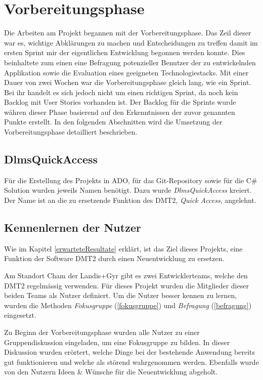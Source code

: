\section{Vorbereitungsphase}
Die Arbeiten am Projekt begannen mit der Vorbereitungsphase. Das Zeil dieser war es, wichtige Abklärungen zu machen und Entscheidungen zu treffen damit im ersten Sprint mir der eigentlichen Entwicklung begonnen werden konnte.
Dies beinhaltete zum einen eine Befragung potenzieller Benutzer der zu entwickelnden Applikation sowie die Evaluation eines geeigneten Technologiestacks.
Mit einer Dauer von zwei Wochen war die Vorbereitungsphase gleich lang, wie ein Sprint.
Bei ihr handelt es sich jedoch nicht um einen richtigen Sprint, da noch kein Backlog mit User Stories vorhanden ist.
Der Backlog für die Sprints wurde währen dieser Phase basierend auf den Erkenntnissen der zuvor genannten Punkte erstellt.
In den folgenden Abschnitten wird die Umsetzung der Vorbereitungsphase detailliert beschrieben.

\subsection{DlmsQuickAccess}
Für die Erstellung des Projekts in \ac{ADO}, für das Git-Repository sowie für die C\# Solution wurden jeweils Namen benötigt.
Dazu wurde \textit{DlmsQuickAccess} kreiert.
Der Name ist an die zu ersetzende Funktion des \ac{DMT2}, \textit{Quick Access}, angelehnt.

\subsection{Kennenlernen der Nutzer}\label{survey}
Wie im Kapitel \ref{erwarteteResultate} erklärt, ist das Ziel dieses Projekts, eine Funktion der Software \ac{DMT2} durch einen Neuentwicklung zu ersetzen.

Am Standort Cham der Landis+Gyr gibt es zwei Entwicklerteams, welche den \ac{DMT2} regelmässig verwenden.
Für dieses Projekt wurden die Mitglieder dieser beiden Teams als Nutzer definiert.
Um die Nutzer besser kennen zu lernen, wurden die Methoden \textit{Fokusgruppe} (\ref{fokusgruppe}) und \textit{Befragung} (\ref{befragung}) eingesetzt.

Zu Beginn der Vorbereitungsphase wurden alle Nutzer zu einer Gruppendiskussion eingeladen, um eine Fokusgruppe zu bilden.
In dieser Diskussion wurden erörtert, welche Dinge bei der bestehende Anwendung bereits gut funktionieren und welche als störend wahrgenommen werden.
Ebenfalls wurde von den Nutzern Ideen \& Wünsche für die Neuentwicklung abgeholt.

